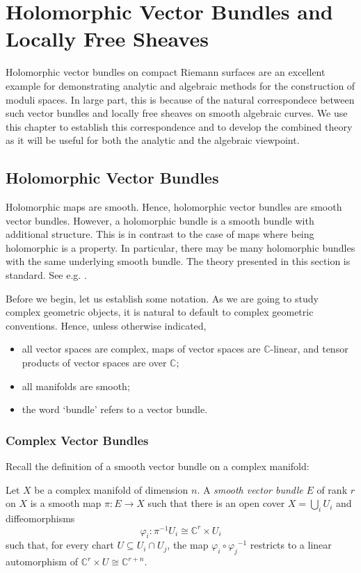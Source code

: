 \documentclass[12pt]{ociamthesis}  %
\begin{document}
\chapter{Holomorphic Vector Bundles and Locally Free Sheaves}

Holomorphic vector bundles on compact Riemann surfaces are an excellent
example for demonstrating analytic and algebraic methods for 
the construction of moduli spaces. In large part, this is because
of the natural correspondece between such vector bundles and
locally free sheaves on smooth algebraic curves. We use this
chapter to establish this correspondence and to develop the combined
theory as it will be useful for both the analytic and the algebraic
viewpoint.


\section{Holomorphic Vector Bundles}

Holomorphic maps are smooth. Hence, holomorphic vector bundles
are smooth vector bundles. However, a holomorphic bundle is a 
smooth bundle with additional structure. This is in contrast to
the case of maps where being holomorphic is a property. In particular,
there may be many holomorphic bundles with
the same underlying smooth bundle. The theory presented
in this section is standard. See e.g. \cite{moroianu2004}.

Before we begin, let us establish some notation. As we are going to study
complex geometric objects, it is natural to default to complex
geometric conventions. Hence, unless otherwise indicated,
\begin{itemize}
  \item all vector spaces are complex, maps of vector spaces are
        $\mathbb{C}$-linear, and tensor products of vector spaces are
        over $\mathbb{C}$;
  \item all manifolds are smooth;
  \item the word `bundle' refers to a vector bundle.
\end{itemize}

\subsection{Complex Vector Bundles}

Recall the definition of a smooth vector bundle on a complex manifold:

\begin{definition}\label{def:complex_bundle}
  Let $X$ be a complex manifold of dimension $n$. A
  \emph{smooth vector bundle} $E$ of rank $r$ on $X$ is a smooth map
  $\pi : E\to X$ such that there
  is an open cover $X = \bigcup_i U_i$ and diffeomorphisms
  \begin{equation}\label{eq:smooth_trivialisation}
    \varphi_i : {\pi}^{-1}U_i \cong \mathbb{C}^r \times U_i
  \end{equation}
  such that, for every chart $U\subseteq U_i\cap U_j$, the
  map $\varphi_i \circ {\varphi_j}^{-1}$ restricts to a linear
  automorphism of $\mathbb{C}^r\times U \cong \mathbb{C}^{r+n}$.
\end{definition}
\end{document}
